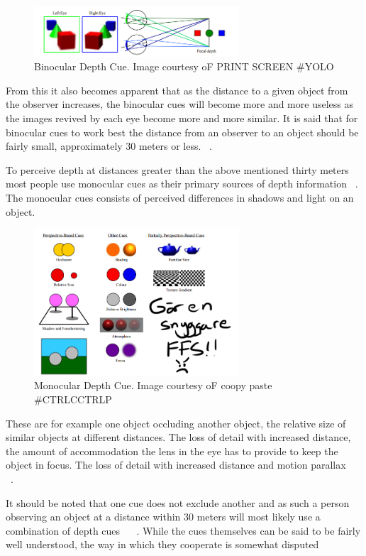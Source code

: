 \documentclass[tog]{acmsiggraph}
\begin{document}
\begin{figure}[ht]
	\centering
	\includegraphics[width=3.0in]{images/depthCuesBinocular}
	\caption{Binocular Depth Cue. Image courtesy oF PRINT SCREEN \#YOLO}
	\label{fig:DepthPerception}
\end{figure}
 
From this it also becomes apparent that as the distance to a given object from the observer increases, the binocular cues will become more and more useless as the images revived by each eye become more and more similar. It is said that for binocular cues to work best the distance from an observer to an object should be fairly small, approximately 30 meters or less. ~\cite {Palvqvist:2013:DPDS}.

To perceive depth at distances greater than the above mentioned thirty meters most people use monocular cues as their primary sources of depth information ~\cite {Palvqvist:2013:DPDS}. The monocular cues consists of perceived differences in shadows and light on an object.

\begin{figure}[ht]
	\centering
	\includegraphics[width=3.0in]{images/depthCues}
	\caption{Monocular Depth Cue. Image courtesy oF coopy paste \#CTRLCCTRLP}
	\label{fig:DepthPerception}
\end{figure}

These are for example one object occluding another object, the relative size of similar objects at different distances. The loss of detail with increased distance, the amount of accommodation the lens in the eye has to provide to keep the object in focus. The loss of detail with increased distance and motion parallax ~\cite {Kemeny:2003:DPDSE}  ~\cite {Pfautz:2002:DPCG}.


It should be noted that one cue does not exclude another and as such a person observing an object at a distance within 30 meters will most likely use a combination of depth cues ~\cite {Boyd:2000:DPC}  ~\cite {Pfautz:2002:DPCG}. While the cues themselves can be said to be fairly well understood, the way in which they cooperate is somewhat disputed ~\cite {Boyd:2000:DPC} 
\end{document}
